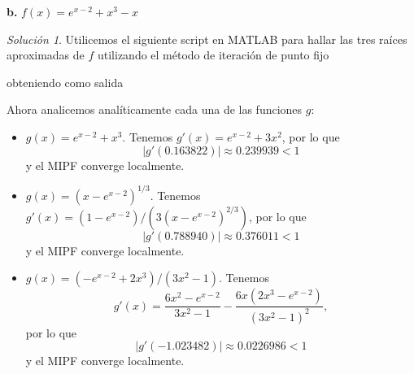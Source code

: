 \documentclass{article}
\newenvironment{statement}[1]{\smallskip\noindent\color[rgb]{1.00,0.00,0.50} {\bf #1.}}{}
\theoremstyle{definition}
\theoremstyle{remark}
\newtheorem*{solution}{Soluci\'on}
\begin{document}
\begin{statement}{b}
  $f(x) = e^{x - 2} + x^3 - x$
\end{statement}

\begin{solution}
  Utilicemos el siguiente script en MATLAB para hallar las tres ra\'ices aproximadas
  de $f$ utilizando el m\'etodo de iteraci\'on de punto fijo
  
  obteniendo como salida

  

  Ahora analicemos anal\'iticamente cada una de las funciones $g$:
  \begin{itemize}
    \item $g(x) = e^{x - 2} + x^3$. Tenemos $g'(x) = e^{x - 2} + 3x^2$, por lo que
    \[
      |g'(0.163822)| \approx 0.239939 < 1
    \]
    y el MIPF converge localmente.
    \item $g(x) = (x - e^{x - 2})^{1 / 3}$. Tenemos $g'(x) = (1 - e^{x - 2}) / (3(x - e^{x - 2})^{2 / 3})$, por lo que
    \[
      |g'(0.788940)| \approx 0.376011 < 1
    \]
    y el MIPF converge localmente.
    \item $g(x) = (-e^{x - 2} + 2x^3) / (3x^2 - 1)$. Tenemos
    \[
      g'(x) = \frac{6x^2 - e^{x - 2}}{3x^2 - 1} - \frac{6x(2x^3 - e^{x - 2})}{(3x^2 - 1)^2},
    \]
    por lo que
    \[
      |g'(-1.023482)| \approx 0.0226986 < 1
    \]
    y el MIPF converge localmente.
  \end{itemize}
\end{solution}
\end{document}
